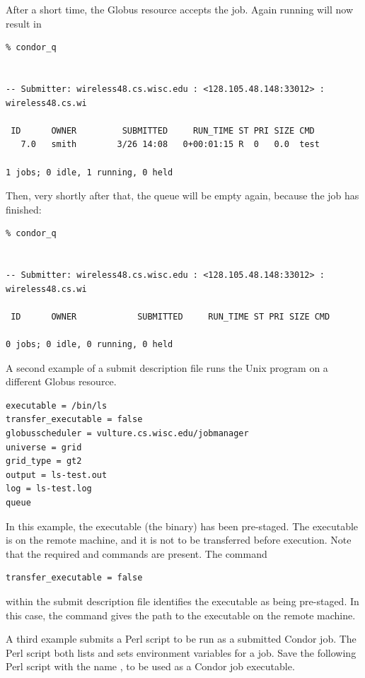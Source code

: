 After a short time, the Globus resource accepts the job.
Again running  will now result in

\footnotesize
\begin{verbatim}
% condor_q


-- Submitter: wireless48.cs.wisc.edu : <128.105.48.148:33012> : wireless48.cs.wi

 ID      OWNER         SUBMITTED     RUN_TIME ST PRI SIZE CMD
   7.0   smith        3/26 14:08   0+00:01:15 R  0   0.0  test

1 jobs; 0 idle, 1 running, 0 held
\end{verbatim}
\normalsize

Then, very shortly after that, the queue will be empty again,
because the job has finished:

\footnotesize
\begin{verbatim}
% condor_q


-- Submitter: wireless48.cs.wisc.edu : <128.105.48.148:33012> : wireless48.cs.wi

 ID      OWNER            SUBMITTED     RUN_TIME ST PRI SIZE CMD

0 jobs; 0 idle, 0 running, 0 held
\end{verbatim}
\normalsize


A second example of a submit description file runs the Unix 
program on a different Globus resource.

\footnotesize
\begin{verbatim}
executable = /bin/ls
transfer_executable = false
globusscheduler = vulture.cs.wisc.edu/jobmanager
universe = grid
grid_type = gt2
output = ls-test.out
log = ls-test.log
queue
\end{verbatim} 
\normalsize

In this example, the executable (the binary) has been pre-staged.
The executable is on the remote machine, and it is not to
be transferred before execution.
Note that the required 
 and 
commands are present.
The command
\begin{verbatim}
transfer_executable = false
\end{verbatim}
within the submit description file identifies the executable
as being pre-staged.
In this case, the 
command gives the path to the executable on the remote machine.

A third example submits a Perl script to be run as a submitted
Condor job.
The Perl script both lists and sets
environment variables for a job.
Save the following Perl script with the name ,
to be used as a Condor job executable.


